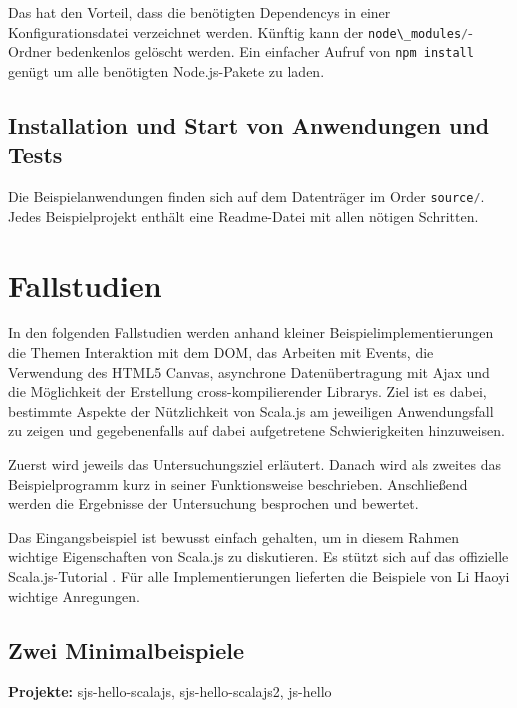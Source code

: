 \documentclass[a4paper, 12pt, hidelinks, listof=totoc, listoftables=totoc, bibliography=totoc]{scrreprt}
\newcommand{\code}[1]{\lstinline[language=Scala, style=inline]|#1|}
\begin{document}
Das hat den Vorteil, dass die benötigten Dependencys in einer Konfigurationsdatei verzeichnet werden. Künftig kann der \code{node\_modules/}-Ordner bedenkenlos gelöscht werden. Ein einfacher Aufruf von \code{npm install} genügt um alle benötigten Node.js-Pakete zu laden.


\section{Installation und Start von Anwendungen und Tests}

Die Beispielanwendungen finden sich auf dem Datenträger im Order \code{source/}. Jedes Beispielprojekt enthält eine Readme-Datei mit allen nötigen Schritten.


\chapter{Fallstudien}\label{chap:case-studies}

In den folgenden Fallstudien werden anhand kleiner Beispielimplementierungen die Themen Interaktion mit dem \ac{DOM}, das Arbeiten mit Events, die Verwendung des HTML5 Canvas, asynchrone Datenübertragung mit Ajax und die Möglichkeit der Erstellung cross-kompilierender Librarys. Ziel ist es dabei, bestimmte Aspekte der Nützlichkeit von Scala.js am jeweiligen Anwendungsfall zu zeigen und gegebenenfalls auf dabei aufgetretene Schwierigkeiten hinzuweisen.

Zuerst wird jeweils das Untersuchungsziel erläutert. Danach wird als zweites das Beispielprogramm kurz in seiner Funktionsweise beschrieben. Anschließend werden die Ergebnisse der Untersuchung besprochen und bewertet.

Das Eingangsbeispiel ist bewusst einfach gehalten, um in diesem Rahmen wichtige Eigenschaften von Scala.js zu diskutieren. Es stützt sich auf das offizielle Scala.js-Tutorial \cite{scalajs.SJT}. Für alle Implementierungen lieferten die Beispiele von Li Haoyi \cite{haoyi.HOS} wichtige Anregungen.



\section{Zwei Minimalbeispiele}

\textbf{Projekte:} sjs-hello-scalajs, sjs-hello-scalajs2, js-hello
\end{document}

